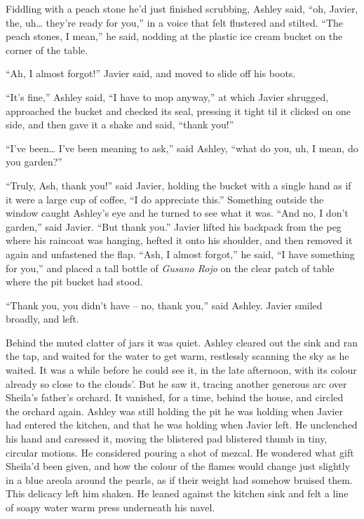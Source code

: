 \documentclass[
]{article}
\begin{document}
Fiddling with a peach stone he'd just finished scrubbing, Ashley said,
``oh, Javier, the, uh\ldots{} they're ready for you,'' in a voice that
felt flustered and stilted. ``The peach stones, I mean,'' he said,
nodding at the plastic ice cream bucket on the corner of the table.

``Ah, I almost forgot!'' Javier said, and moved to slide off his boots.

``It's fine,'' Ashley said, ``I have to mop anyway,'' at which Javier
shrugged, approached the bucket and checked its seal, pressing it tight
til it clicked on one side, and then gave it a shake and said, ``thank
you!''

``I've been\ldots{} I've been meaning to ask,'' said Ashley, ``what do
you, uh, I mean, do you garden?''

``Truly, Ash, thank you!'' said Javier, holding the bucket with a single
hand as if it were a large cup of coffee, ``I do appreciate this.''
Something outside the window caught Ashley's eye and he turned to see
what it was. ``And no, I don't garden,'' said Javier. ``But thank you.''
Javier lifted his backpack from the peg where his raincoat was hanging,
hefted it onto his shoulder, and then removed it again and unfastened
the flap. ``Ash, I almost forgot,'' he said, ``I have something for
you,'' and placed a tall bottle of \emph{Gusano Rojo} on the clear patch
of table where the pit bucket had stood.

``Thank you, you didn't have -- no, thank you,'' said Ashley. Javier
smiled broadly, and left.

Behind the muted clatter of jars it was quiet. Ashley cleared out the
sink and ran the tap, and waited for the water to get warm, restlessly
scanning the sky as he waited. It was a while before he could see it, in
the late afternoon, with its colour already so close to the clouds'. But
he saw it, tracing another generous arc over Sheila's father's orchard.
It vanished, for a time, behind the house, and circled the orchard
again. Ashley was still holding the pit he was holding when Javier had
entered the kitchen, and that he was holding when Javier left. He
unclenched his hand and caressed it, moving the blistered pad blistered
thumb in tiny, circular motions. He considered pouring a shot of mezcal.
He wondered what gift Sheila'd been given, and how the colour of the
flames would change just slightly in a blue areola around the pearls, as
if their weight had somehow bruised them. This delicacy left him shaken.
He leaned against the kitchen sink and felt a line of soapy water warm
press underneath his navel.
\end{document}

